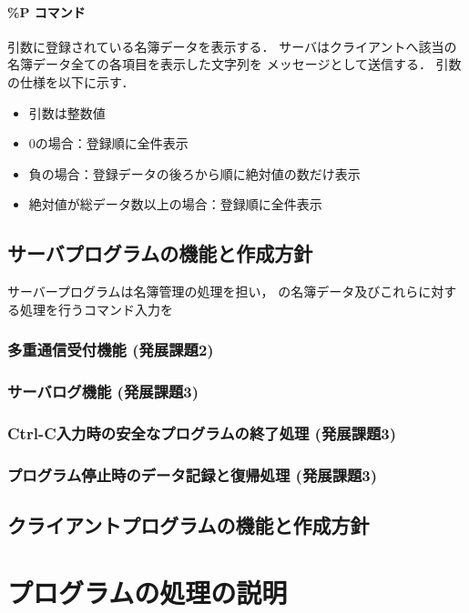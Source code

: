 \paragraph*{\%P コマンド}
引数に登録されている名簿データを表示する．
サーバはクライアントへ該当の名簿データ全ての各項目を表示した文字列を
メッセージとして送信する．
引数の仕様を以下に示す．
\begin{itemize}
  \item 引数は整数値
  \item $0$の場合：登録順に全件表示
  \item 負の場合：登録データの後ろから順に絶対値の数だけ表示
  \item 絶対値が総データ数以上の場合：登録順に全件表示
\end{itemize}


\subsection{サーバプログラムの機能と作成方針}
サーバープログラムは名簿管理の処理を担い，
の名簿データ及びこれらに対する処理を行うコマンド入力を

\subsubsection{多重通信受付機能 (発展課題2)}

\subsubsection{サーバログ機能 (発展課題3)}

\subsubsection{Ctrl-C入力時の安全なプログラムの終了処理 (発展課題3)}

\subsubsection{プログラム停止時のデータ記録と復帰処理 (発展課題3)}

\subsection{クライアントプログラムの機能と作成方針}

\section{プログラムの処理の説明}

